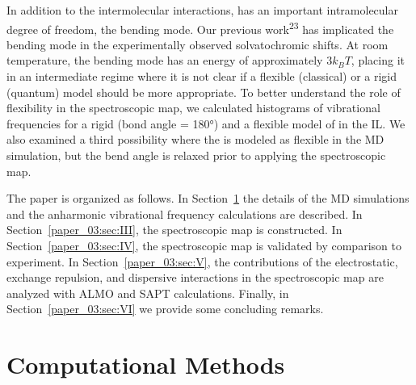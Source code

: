 In addition to the intermolecular interactions,  has an important intramolecular degree of freedom, the bending mode. Our previous work\textsuperscript{23} has implicated the bending mode in the experimentally observed solvatochromic shifts. At room temperature, the bending mode has an energy of approximately \(3k_{B}T\), placing it in an intermediate regime where it is not clear if a flexible (classical) or a rigid (quantum) model should be more appropriate. To better understand the role of  flexibility in the spectroscopic map, we calculated histograms of vibrational frequencies for a rigid (bond angle = \ang{180}) and a flexible model of  in the \ce{[C4C1im][PF6]} IL. We also examined a third possibility where the  is modeled as flexible in the MD simulation, but the bend angle is relaxed prior to applying the spectroscopic map.

The paper is organized as follows. In Section~\ref{paper_03:sec:II} the details of the MD simulations and the anharmonic vibrational frequency calculations are described. In Section~\ref{paper_03:sec:III}, the spectroscopic map is constructed. In Section~\ref{paper_03:sec:IV}, the spectroscopic map is validated by comparison to experiment. In Section~\ref{paper_03:sec:V}, the contributions of the electrostatic, exchange repulsion, and dispersive interactions in the spectroscopic map are analyzed with ALMO and SAPT calculations. Finally, in Section~\ref{paper_03:sec:VI} we provide some concluding remarks.

\section{Computational Methods}
\label{paper_03:sec:II}


